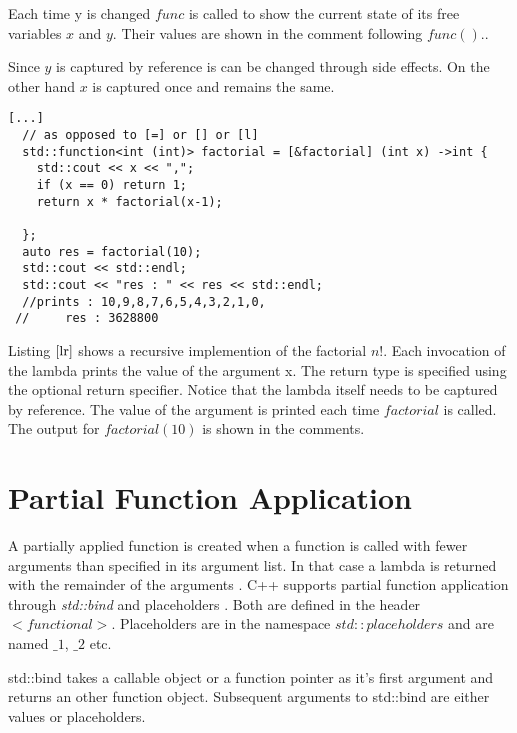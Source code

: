 \documentclass[12pt,fleqn]{article}
\begin{document}
Each time y is changed $func$ is called to show the current state of its free variables $x$ and $y$.
Their values are shown in the comment following $func()$..  

Since $y$ is captured by reference is can be changed through side effects.
On the other hand $x$ is captured once and remains the same.
%
\begin{lstlisting}[caption=Implementation of factorial using lambda recursion, label=lr]
[...]
  // as opposed to [=] or [] or [l]
  std::function<int (int)> factorial = [&factorial] (int x) ->int {
    std::cout << x << ",";
    if (x == 0) return 1;
    return x * factorial(x-1);
    
  };
  auto res = factorial(10);
  std::cout << std::endl;
  std::cout << "res : " << res << std::endl;
  //prints : 10,9,8,7,6,5,4,3,2,1,0,
 //     res : 3628800
\end{lstlisting}
%
Listing $\ref{lr}$ shows a recursive implemention of the factorial $n!$. 
Each invocation of the lambda prints the value of the argument x.
The return type is specified using the optional return specifier.
Notice that the lambda itself needs to be captured by reference.
The value of the argument is printed each time $factorial$ is called.
The output for $factorial(10)$ is shown in the comments.
 
\section*{Partial Function Application}
A partially applied function is created when a function is called with fewer arguments than specified in its argument list.
In that case a lambda is returned with the remainder of the arguments \cite{field}.
C++ supports partial function application through {\em std::bind} \cite{std::bind} and placeholders \cite{std::placeholder}.
Both are defined in the header $<functional>$. 
Placeholders are in the namespace $std::placeholders$ and are named $\_1$, $\_2$ etc.

std::bind takes a callable object or a function pointer as it's first argument and returns an other function object.
Subsequent arguments to std::bind are either values or placeholders.
\end{document}
